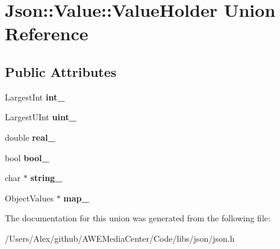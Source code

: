 \hypertarget{union_json_1_1_value_1_1_value_holder}{\section{Json\-:\-:Value\-:\-:Value\-Holder Union Reference}
\label{union_json_1_1_value_1_1_value_holder}
}
\subsection*{Public Attributes}
\begin{DoxyCompactItemize}
\item 
\hypertarget{union_json_1_1_value_1_1_value_holder_adbfb384301298844ed955ba5cf6015a0}{Largest\-Int {\bfseries int\-\_\-}}\label{union_json_1_1_value_1_1_value_holder_adbfb384301298844ed955ba5cf6015a0}

\item 
\hypertarget{union_json_1_1_value_1_1_value_holder_aab65665dc15a24a29a8e93cdeeaa7e50}{Largest\-U\-Int {\bfseries uint\-\_\-}}\label{union_json_1_1_value_1_1_value_holder_aab65665dc15a24a29a8e93cdeeaa7e50}

\item 
\hypertarget{union_json_1_1_value_1_1_value_holder_af0c5ca724e5fe3a15db773d750e2351e}{double {\bfseries real\-\_\-}}\label{union_json_1_1_value_1_1_value_holder_af0c5ca724e5fe3a15db773d750e2351e}

\item 
\hypertarget{union_json_1_1_value_1_1_value_holder_a92edab1861dadbfefd8be5fd4285eefe}{bool {\bfseries bool\-\_\-}}\label{union_json_1_1_value_1_1_value_holder_a92edab1861dadbfefd8be5fd4285eefe}

\item 
\hypertarget{union_json_1_1_value_1_1_value_holder_a70ac2b153bc405527baa3850d2ddc3cb}{char $\ast$ {\bfseries string\-\_\-}}\label{union_json_1_1_value_1_1_value_holder_a70ac2b153bc405527baa3850d2ddc3cb}

\item 
\hypertarget{union_json_1_1_value_1_1_value_holder_a1e7a5b86d4f52234f55c847ad1ce389a}{Object\-Values $\ast$ {\bfseries map\-\_\-}}\label{union_json_1_1_value_1_1_value_holder_a1e7a5b86d4f52234f55c847ad1ce389a}

\end{DoxyCompactItemize}


The documentation for this union was generated from the following file\-:\begin{DoxyCompactItemize}
\item 
/\-Users/\-Alex/github/\-A\-W\-E\-Media\-Center/\-Code/libs/json/json.\-h\end{DoxyCompactItemize}
